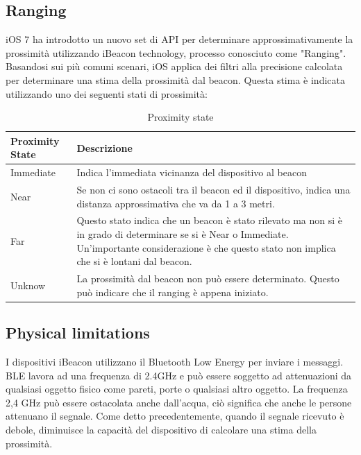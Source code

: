 \subsection{Ranging}
iOS 7 ha introdotto un nuovo set di API per determinare approssimativamente la prossimità utilizzando iBeacon technology, processo conosciuto come "Ranging". 
Basandosi sui più comuni scenari, iOS applica dei filtri alla precisione calcolata per determinare una stima della prossimità dal beacon.
Questa stima è indicata utilizzando uno dei seguenti stati di prossimità:
\begin{table}[htbp]
\begin{center}
\begin{tabular}{|l|p{9cm}|}
\hline
Proximity State & Descrizione \\
\hline
Immediate & Indica l'immediata vicinanza del dispositivo al beacon \\
\hline
Near & Se non ci sono ostacoli tra il beacon ed il dispositivo, indica una distanza approssimativa che va da 1 a 3 metri. \\
\hline
Far & Questo stato indica che un beacon è stato rilevato ma non si è in grado di determinare se si è Near o Immediate. 
Un'importante considerazione è che questo stato non implica che si è lontani dal beacon.\\
\hline
Unknow & La prossimità dal beacon non può essere determinato.
Questo può indicare che il ranging è appena iniziato. \\
\hline
\end{tabular}
\end{center}
\caption{Proximity state}
\label{tab:state}
\end{table}

\subsection{Physical limitations}
I dispositivi iBeacon utilizzano il Bluetooth Low Energy per inviare i messaggi.
BLE lavora ad una frequenza di 2.4GHz e può essere soggetto ad attenuazioni da qualsiasi oggetto fisico come pareti, porte o qualsiasi altro oggetto. La frequenza 2,4 GHz può essere ostacolata anche dall'acqua, ciò significa che anche le persone attenuano il segnale. Come detto precedentemente, quando il segnale ricevuto è debole, diminuisce la capacità del dispositivo di calcolare una stima della prossimità.

